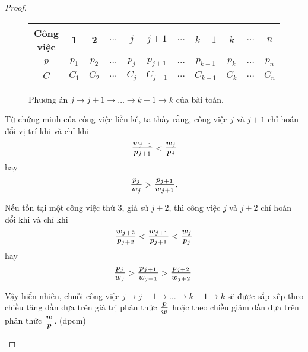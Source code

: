 \documentclass[12pt,a4paper]{report}
\begin{document}
\begin{proof}
\begin{itemize}
\begin{figure}[h!]
	\centering
	 \begin{tabular}{|c | c c c c c c c c c c |} 
	 \hline
	 Công việc & 1 & 2 & $\ldots$ & $j$ & $j+1$ & $\ldots$ & $k-1$ & $k$ & $\ldots$ & $n$ \\
	 \hline\hline
	 $p$ & $p_1$ & $p_2$ & $\ldots$ & $p_j$ & $p_{j+1}$ & $\ldots$ & $p_{k-1}$ & $p_k$ & $\ldots$ & $p_n$ \\
	 $C$ & $C_1$ & $C_2$ & $\ldots$ & $C_j$ & $C_{j+1}$ & $\ldots$ & $C_{k-1}$ & $C_k$ & $\ldots$ & $C_n$ \\
	 \hline
	 \end{tabular}
\caption{\label{jk1}Phương án $j \rightarrow j+1 \rightarrow \ldots \rightarrow k-1 \rightarrow k$ của bài toán.}
\end{figure}

Từ chứng minh của công việc liền kề, ta thấy rằng, công việc $j$ và $j+1$ chỉ hoán đổi vị trí khi và chỉ khi $$\scalebox{1.3}{$\frac{w_{j+1}}{p_{j+1}}$} < \scalebox{1.3}{$\frac{w_j}{p_j}$}$$ hay $$\scalebox{1.3}{$\frac{p_j}{w_j}$} > \scalebox{1.3}{$\frac{p_{j+1}}{w_{j+1}}$}.$$

Nếu tồn tại một công việc thứ 3, giả sử $j+2$, thì công việc $j$ và $j+2$ chỉ hoán đổi khi và chỉ khi $$\scalebox{1.3}{$\frac{w_{j+2}}{p_{j+2}}$} < \scalebox{1.3}{$\frac{w_{j+1}}{p_{j+1}}$} < \scalebox{1.3}{$\frac{w_j}{p_j}$}$$ hay $$\scalebox{1.3}{$\frac{p_j}{w_j}$} > \scalebox{1.3}{$\frac{p_{j+1}}{w_{j+1}}$} > \scalebox{1.3}{$\frac{p_{j+2}}{w_{j+2}}$}.$$

Vậy hiển nhiên, chuỗi công việc $j \rightarrow j+1 \rightarrow \ldots \rightarrow k-1 \rightarrow k$ sẽ được sắp xếp theo chiều tăng dần dựa trên giá trị phân thức $\scalebox{1.3}{$\frac{p}{w}$}$ hoặc theo chiều giảm dần dựa trên phân thức $\scalebox{1.3}{$\frac{w}{p}$}$. (đpcm)

\end{itemize}




\end{proof}
\end{document}

